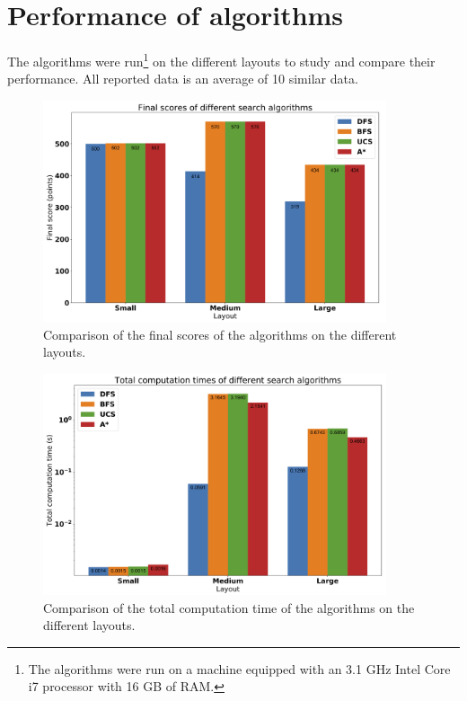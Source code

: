 \documentclass[a4paper, 12pt]{article}
\begin{document}
	
	\section{Performance of algorithms}
	The algorithms were run\footnote{The algorithms were run on a machine equipped with an 3.1 GHz Intel Core i7 processor with 16 GB of RAM.} on the different layouts to study and compare their performance. All reported data is an average of 10 similar data.
	
	\newpage
	
	\begin{figure}[!ht]
    	\centering
        \includegraphics[width=0.9\textwidth]{resources/png/scores.png}
        \caption{Comparison of the final scores of the algorithms on the different layouts.}
        \label{fig:scores}
    \end{figure}
    
    \begin{figure}[!ht]
    	\centering
        \includegraphics[width=0.9\textwidth]{resources/png/times.png}
        \caption{Comparison of the total computation time of the algorithms on the different layouts.}
        \label{fig:times}
    \end{figure}
	
\end{document}
